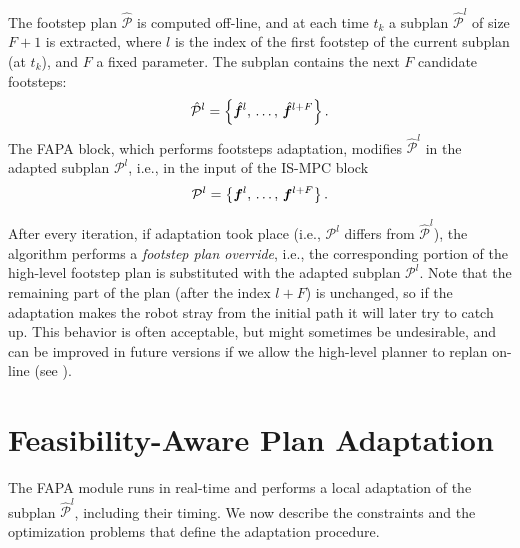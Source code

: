 The footstep plan $\mathcal{\hat P}$ is computed off-line, and at each time $t_k$ a subplan $\mathcal{\hat P}^l$ of size $F+1$ is extracted, where $l$ is the index of the first footstep of the current subplan (at $t_k$), and $F$ a fixed parameter. The subplan contains the next $F$ candidate footsteps:
\begin{equation*}
\mathcal{\hat P}^l = \left\{
\hat{{\bm{f}}}^{l},\,\dots,\,\hat{{\bm{f}}}^{l+F}
\right\}.
\end{equation*}
The FAPA block, which performs footsteps adaptation, modifies $\mathcal{\hat P}^l$ in the adapted subplan $\mathcal{P}^l$, i.e., in the input of the IS-MPC block
\begin{equation*}
\mathcal{P}^l = \left\{
{\bm{f}}^{l},\,\dots,\,{\bm{f}}^{l+F}
\right\}.
\end{equation*}

After every iteration, if adaptation took place (i.e., $\mathcal{P}^l$ differs from $\mathcal{\hat P}^l$), the algorithm performs a {\em footstep plan override}, i.e., the corresponding portion of the high-level footstep plan is substituted with the adapted subplan $\mathcal{P}^l$. Note that the remaining part of the plan (after the index $l+F$) is unchanged, so if the adaptation makes the robot stray from the initial path it will later try to catch up. This behavior is often acceptable, but might sometimes be undesirable, and can be improved in future versions if we allow the high-level planner to replan on-line (see \cite{Cipriano2023RAS}).

\section{Feasibility-Aware Plan Adaptation}
\label{sec:FAPA:FeasibilityAwarePlanAdaptation}
The FAPA module runs in real-time and performs a local adaptation of the subplan $\mathcal{\hat P}^l$, including their timing. We now describe the constraints and the optimization problems that define the adaptation procedure.

